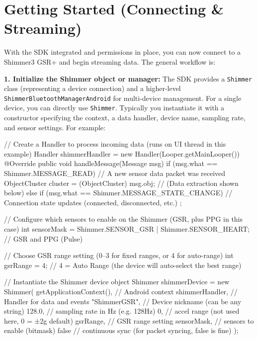 {{\section{Getting Started (Connecting & Streaming)}

With the SDK integrated and permissions in place, you can now connect to
a Shimmer3 GSR+ and begin streaming data. The general workflow is:

\textbf{1. Initialize the Shimmer object or manager:} The SDK provides a
\texttt{Shimmer} class (representing a device connection) and a higher-level
\texttt{ShimmerBluetoothManagerAndroid} for multi-device management. For a
single device, you can directly use \texttt{Shimmer}. Typically you instantiate
it with a constructor specifying the context, a data handler, device
name, sampling rate, and sensor settings. For example:

    // Create a Handler to process incoming data (runs on UI thread in this example)
    Handler shimmerHandler = new Handler(Looper.getMainLooper()) {
        @Override
        public void handleMessage(Message msg) {
            if (msg.what == Shimmer.MESSAGE_READ) {
                // A new sensor data packet was received
                ObjectCluster cluster = (ObjectCluster) msg.obj;
                // (Data extraction shown below)
            } else if (msg.what == Shimmer.MESSAGE_STATE_CHANGE) {
                // Connection state updates (connected, disconnected, etc.)
            }
        }
    };

    // Configure which sensors to enable on the Shimmer (GSR, plus PPG in this case)
    int sensorMask = Shimmer.SENSOR_GSR | Shimmer.SENSOR_HEART;  // GSR and PPG (Pulse)

    // Choose GSR range setting (0–3 for fixed ranges, or 4 for auto-range)
    int gsrRange = 4;  // 4 = Auto Range (the device will auto-select the best range)

    // Instantiate the Shimmer device object
    Shimmer shimmerDevice = new Shimmer(
            getApplicationContext(),           // Android context
            shimmerHandler,                    // Handler for data and events
            "ShimmerGSR",                      // Device nickname (can be any string)
            128.0,                             // sampling rate in Hz (e.g. 128Hz)
            0,                                 // accel range (not used here, 0 = ±2g default)
            gsrRange,                          // GSR range setting
            sensorMask,                        // sensors to enable (bitmask)
            false                              // continuous sync (for packet syncing, false is fine)
    );

}}
